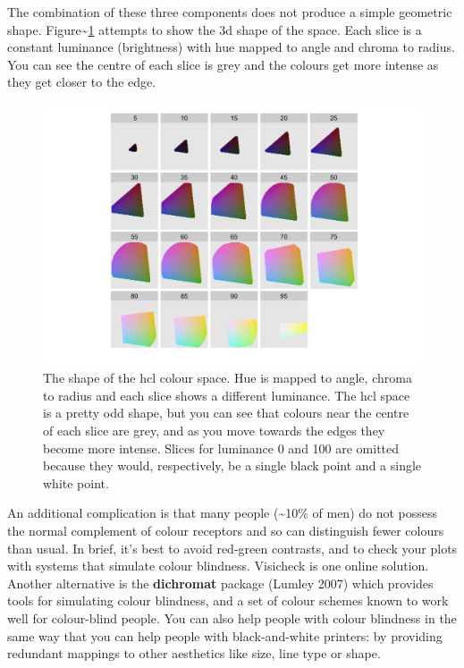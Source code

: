 The combination of these three components does not produce a simple
geometric shape. Figure\textasciitilde{}\ref{fig:hcl} attempts to show
the 3d shape of the space. Each slice is a constant luminance
(brightness) with hue mapped to angle and chroma to radius. You can see
the centre of each slice is grey and the colours get more intense as
they get closer to the edge.

\begin{figure}[htbp]
  \centering
    \includegraphics[width=\linewidth]{diagrams/hcl-space}
  \caption{The shape of the hcl colour space.  Hue is mapped to angle, chroma to radius and each slice shows a different luminance.  The hcl space is a pretty odd shape, but you can see that colours near the centre of each slice are grey, and as you move towards the edges they become more intense.  Slices for luminance 0 and 100 are omitted because they would, respectively, be a single black point and a single white point.}
  \label{fig:hcl}
\end{figure}

An additional complication is that many people (\textasciitilde{}10\% of
men) do not possess the normal complement of colour receptors and so can
distinguish fewer colours than usual.  In brief,
it's best to avoid red-green contrasts, and to check your plots with
systems that simulate colour blindness. Visicheck is one online
solution. Another alternative is the \textbf{dichromat} package (Lumley
2007) which provides tools for simulating colour blindness, and a set of
colour schemes known to work well for colour-blind people. You can also
help people with colour blindness in the same way that you can help
people with black-and-white printers: by providing redundant mappings to
other aesthetics like size, line type or shape.

